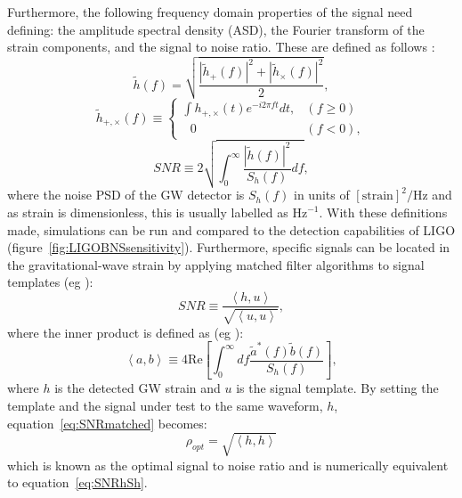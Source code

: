 	Furthermore, the following frequency domain properties of the signal need defining: the amplitude spectral density (ASD), the Fourier transform of the strain components, and the signal to noise ratio. These are defined as follows \citep{Rezzolla2016}:
\begin{equation}
	\tilde{h}(f)=\sqrt{\dfrac{|\tilde{h}_+(f)|^2+|\tilde{h}_\times(f)|^2}{2}},
	\label{eq:hPSD}
\end{equation}
\begin{equation}
	\tilde{h}_{+,\times}(f) \equiv 
	\begin{cases}
		\displaystyle\int h_{+,\times}(t)e^{-i2\pi f t}dt, & (f\geq 0) \\
		\ \ \ 0 & (f < 0),
	\end{cases}
	\label{eq:hFourier}
\end{equation}
\begin{equation}
	SNR \equiv 2\sqrt{\displaystyle\int_{0}^{\infty}\dfrac{|\tilde{h}(f)|^2}{S_h(f)}df},
	\label{eq:SNRhSh}
\end{equation}
	where the noise PSD of the GW detector is $S_h(f)$ in units of $\left[\mathrm{strain}\right]^2/\mathrm{Hz}$ and as strain is dimensionless, this is usually labelled as $\mathrm{Hz}^{-1}$. With these definitions made, simulations can be run and compared to the detection capabilities of LIGO (figure~\ref{fig:LIGOBNSsensitivity}). Furthermore, specific signals can be located in the gravitational-wave strain by applying matched filter algorithms to signal templates (eg \cite{Owen1999}):
\begin{equation}
	SNR \equiv \dfrac{\left<h,u\right>}{\sqrt{\left<u,u\right>}},
	\label{eq:SNRmatched}
\end{equation}
	where the inner product is defined as (eg \cite{Owen1999}):
\begin{equation}
	\left<a,b\right>\equiv 4 \mathrm{Re}\left[\displaystyle\int_{0}^{\infty}df\dfrac{\tilde{a}^*\left(f\right)\tilde{b}\left(f\right)}{S_h\left(f\right)}\right],
	\label{eq:InnerProduct}
\end{equation}
	where $h$ is the detected GW strain and $u$ is the signal template. By setting the template and the signal under test to the same waveform, $h$, equation~\ref{eq:SNRmatched} becomes:
\begin{equation}
	\rho_{opt}=\sqrt{\left<h,h\right>}
	\label{eq:SNRopt}
\end{equation}
	which is known as the optimal signal to noise ratio and is numerically equivalent to equation~\ref{eq:SNRhSh}.
